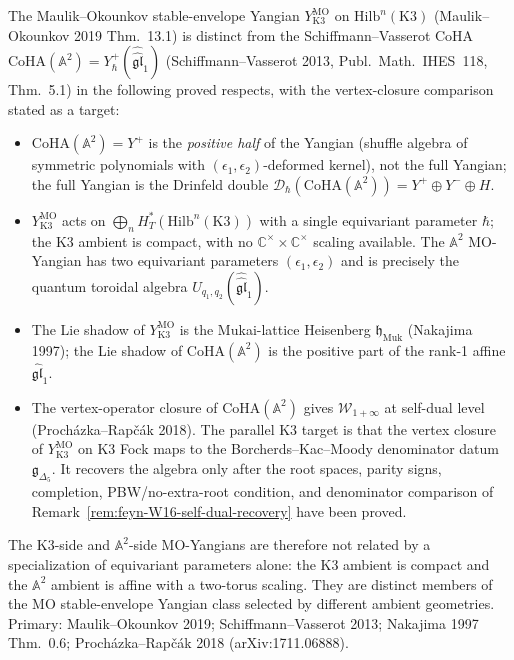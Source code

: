 \begin{remark}
\label{rem:feyn-W16-MO-vs-SV-A2}
The Maulik--Okounkov stable-envelope Yangian
$Y^{\mathrm{MO}}_{\mathrm K3}$ on $\mathrm{Hilb}^n(\mathrm K3)$
(Maulik--Okounkov 2019 Thm.~13.1) is distinct from the
Schiffmann--Vasserot CoHA $\mathrm{CoHA}(\mathbb{A}^2) = Y^+_\hbar
(\widehat{\widehat{\mathfrak{gl}}}_1)$ (Schiffmann--Vasserot 2013,
Publ.~Math.~IHES~118, Thm.~5.1) in the following proved respects,
with the vertex-closure comparison stated as a target:
\begin{itemize}
\item $\mathrm{CoHA}(\mathbb A^2) = Y^+$ is the \emph{positive half}
 of the Yangian (shuffle algebra of symmetric polynomials with
 $(\epsilon_1, \epsilon_2)$-deformed kernel), not the full Yangian;
 the full Yangian is the Drinfeld double
 $\mathcal{D}_\hbar(\mathrm{CoHA}(\mathbb A^2))
 = Y^+ \oplus Y^- \oplus H$.
\item $Y^{\mathrm{MO}}_{\mathrm K3}$ acts on
 $\bigoplus_n H^*_T(\mathrm{Hilb}^n(\mathrm K3))$ with a single
 equivariant parameter $\hbar$; the K3 ambient is compact, with
 no $\mathbb C^\times \times \mathbb C^\times$ scaling available.
 The $\mathbb A^2$ MO-Yangian has two equivariant parameters
 $(\epsilon_1, \epsilon_2)$ and is precisely the quantum toroidal
 algebra $U_{q_1, q_2}(\widehat{\widehat{\mathfrak{gl}}}_1)$.
\item The Lie shadow of $Y^{\mathrm{MO}}_{\mathrm K3}$ is the
 Mukai-lattice Heisenberg $\mathfrak{h}_{\mathrm{Muk}}$ (Nakajima
 1997); the Lie shadow of $\mathrm{CoHA}(\mathbb A^2)$ is the
 positive part of the rank-1 affine $\widehat{\mathfrak{gl}}_1$.
\item The vertex-operator closure of $\mathrm{CoHA}(\mathbb A^2)$
 gives $\mathcal W_{1+\infty}$ at self-dual level
 (Proch\'azka--Rap\v{c}\'ak 2018).  The parallel K3 target is that
 the vertex closure of $Y^{\mathrm{MO}}_{\mathrm K3}$ on K3 Fock
 maps to the Borcherds--Kac--Moody denominator datum
 $\mathfrak{g}_{\Delta_5}$. It recovers the algebra only after the
 root spaces, parity signs, completion, PBW/no-extra-root condition,
 and denominator comparison of
 Remark~\ref{rem:feyn-W16-self-dual-recovery} have been proved.
\end{itemize}
The K3-side and $\mathbb A^2$-side MO-Yangians are therefore not
related by a specialization of equivariant parameters alone: the K3
ambient is compact and the $\mathbb A^2$ ambient is affine with a
two-torus scaling.  They are distinct members of the MO
stable-envelope Yangian class selected by different ambient geometries.
Primary:
Maulik--Okounkov 2019; Schiffmann--Vasserot 2013; Nakajima 1997
Thm.~0.6; Proch\'azka--Rap\v{c}\'ak 2018 (arXiv:1711.06888).
\end{remark}

